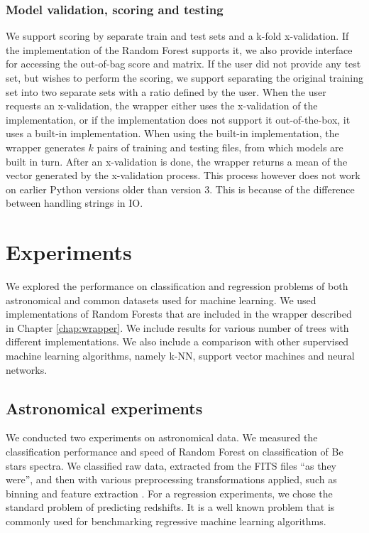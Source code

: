 \documentclass[thesis=B,english]{FITthesis}[2012/10/20]
\begin{document}
\subsection{Model validation, scoring and testing}
\label{sub:wrapper_test}
We support scoring by separate train and test sets and a k-fold x-validation. If the implementation of the Random Forest supports it, we also provide interface for accessing the out-of-bag score and matrix. If the user did not provide any test set, but wishes to perform the scoring, we support separating the original training set into two separate sets with a ratio defined by the user. When the user requests an x-validation, the wrapper either uses the x-validation of the implementation, or if the implementation does not support it out-of-the-box, it uses a built-in implementation. When using the built-in implementation, the wrapper generates \(k\) pairs of training and testing files, from which models are built in turn. After an x-validation is done, the wrapper returns a mean of the vector generated by the x-validation process. This process however does not work on earlier Python versions older than version 3. This is because of the difference between handling strings in IO.  

\chapter{Experiments}
\label{chap:Experiments}
We explored the performance on classification and regression problems of both astronomical and common datasets used for machine learning. We used implementations of Random Forests that are included in the wrapper described in Chapter \ref{chap:wrapper}. We include results for various number of trees with different implementations. We also include a comparison with other supervised machine learning algorithms, namely k-NN, support vector machines and neural networks.
\section{Astronomical experiments}
We conducted two experiments on astronomical data. We measured the classification performance and speed of Random Forest on classification of Be stars spectra. We classified raw data, extracted from the FITS files  ``as they were'', and then with various preprocessing transformations applied, such as binning and feature extraction \cite{bromovabeclass}. For a regression experiments, we chose the standard problem of predicting redshifts. It is a well known problem \cite{RED13,RED10,RED07} that is commonly used for benchmarking regressive machine learning algorithms.
\end{document}
